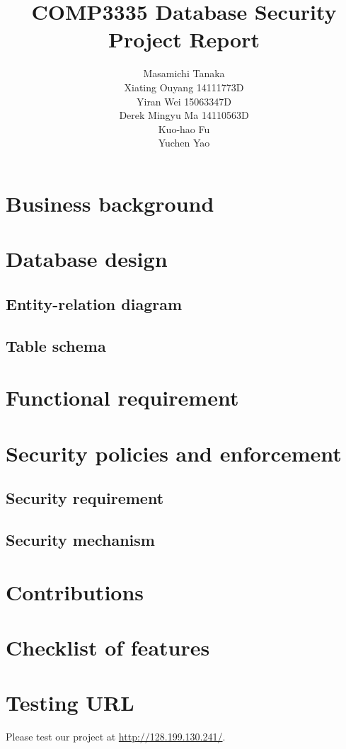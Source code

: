 \documentclass[a4paper,11pt]{article}
\title{\vspace{6cm} COMP3335 Database Security Project Report}
\author{Masamichi Tanaka \\
		Xiating Ouyang  14111773D \\
		Yiran Wei 15063347D  \\
		Derek Mingyu Ma 14110563D \\
		Kuo-hao Fu \\
		Yuchen Yao 
}
\date{}
\theoremstyle{plain} %
\begin{document}
\maketitle	
\newpage
\tableofcontents
\newpage

\section{Business background}

\section{Database design}

\subsection{Entity-relation diagram}

\subsection{Table schema}

\section{Functional requirement}

\section{Security policies and enforcement}

\subsection{Security requirement}


\subsection{Security mechanism}



\section{Contributions}

\section{Checklist of features}
 

\section{Testing URL}
Please test our project at \url{http://128.199.130.241/}.



\end{document}
